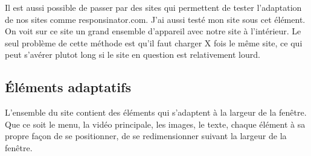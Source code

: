\documentclass{article}
\begin{document}
Il est aussi possible de passer par des sites qui permettent de tester l'adaptation de nos sites comme responsinator.com. J'ai aussi test\'e mon site sous cet \'el\'ement. On voit sur ce site un grand ensemble d'appareil avec notre site \`a l'int\'erieur. Le seul probl\`eme de cette m\'ethode est qu'il faut charger X fois le m\^eme site, ce qui peut s'av\'erer plutot long si le site en question est relativement lourd.\\

\subsection{\'El\'ements adaptatifs}

L'ensemble du site contient des \'el\'ements qui s'adaptent \`a la largeur de la fen\^etre. Que ce soit le menu, la vid\'eo principale, les images, le texte, chaque \'el\'ement \`a sa propre fa\c{c}on de se positionner, de se redimensionner suivant la largeur de la fen\^etre.

\newpage
\end{document}
